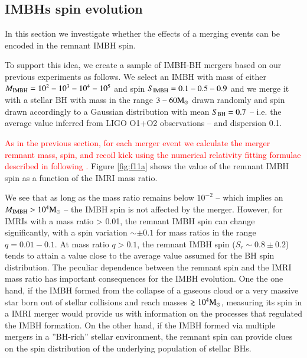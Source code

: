 \documentclass[article]{aa}
\newcommand{\Ms}{{\rm M}_\odot}
\newcommand{\ibh}{{\rm IMBH}}
\newcommand{\bh}{{\rm BH}}
\newcommand{\manuel}{\textcolor{red}}
\begin{document}
\subsection{IMBHs spin evolution}
{\bf 

In this section we investigate whether the effects of a merging events can be encoded in the remnant IMBH spin.

To support this idea, we create a sample of IMBH-BH mergers based on our previous experiments as follows. We select an IMBH with mass of either $M_\ibh = 10^2 - 10^3 - 10^4 - 10^5$ and spin $S_\ibh = 0.1 - 0.5 - 0.9$ and we merge it with a stellar BH with mass in the range $3 - 60 \Ms$ drawn randomly and spin drawn accordingly to a Gaussian distribution with mean $S_\bh = 0.7$ -- i.e. the average value inferred from LIGO O1+O2 observations -- and dispersion 0.1. 

\manuel{As in the previous section, for each merger event we calculate the merger remnant mass, spin, and recoil kick using the numerical relativity fitting formulae described in \cite{jimenez17} following \cite{arca20}.} Figure \ref{fig:f11a} shows the value of the remnant IMBH spin as a function of the IMRI mass ratio. 

We see that as long as the mass ratio remains below $10^{-2}$ -- which implies an $M_\ibh > 10^4 \Ms$ -- the IMBH spin is not affected by the merger. However, for IMRIs with a mass ratio > 0.01, the remnant IMBH spin can change significantly, with a spin variation $\sim \pm 0.1$ for mass ratios in the range $q = 0.01-0.1$. At mass ratio $q>0.1$, the remnant IMBH spin ($S_r \sim 0.8\pm 0.2$) tends to attain a value close to the average value assumed for the BH spin distribution.
The peculiar dependence between the remnant spin and the IMRI mass ratio has important consequences for the IMBH evolution. One the one hand, if the IMBH formed from the collapse of a gaseous cloud or a very massive star born out of stellar collisions and reach masses $\gtrsim 10^4\Ms$, measuring its spin in a IMRI merger would provide us with information on the processes that regulated the IMBH formation. On the other hand,
if the IMBH formed via multiple mergers in a ''BH-rich'' stellar environment, the remnant spin can provide clues on the spin distribution of the underlying population of stellar BHs.

}
\end{document}
